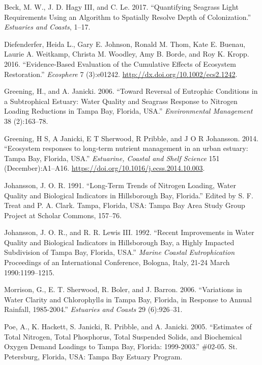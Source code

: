 \documentclass[]{article}
\begin{document}
\leavevmode\hypertarget{ref-Beck17c}{}%
Beck, M. W., J. D. Hagy III, and C. Le. 2017. ``Quantifying Seagrass
Light Requirements Using an Algorithm to Spatially Resolve Depth of
Colonization.'' \emph{Estuaries and Coasts}, 1--17.

\leavevmode\hypertarget{ref-Diefenderfer16}{}%
Diefenderfer, Heida L., Gary E. Johnson, Ronald M. Thom, Kate E. Buenau,
Laurie A. Weitkamp, Christa M. Woodley, Amy B. Borde, and Roy K. Kropp.
2016. ``Evidence-Based Evaluation of the Cumulative Effects of Ecosystem
Restoration.'' \emph{Ecosphere} 7 (3):e01242.
\url{http://dx.doi.org/10.1002/ecs2.1242}.

\leavevmode\hypertarget{ref-Greening06}{}%
Greening, H., and A. Janicki. 2006. ``Toward Reversal of Eutrophic
Conditions in a Subtrophical Estuary: Water Quality and Seagrass
Response to Nitrogen Loading Reductions in Tampa Bay, Florida, USA.''
\emph{Environmental Management} 38 (2):163--78.

\leavevmode\hypertarget{ref-Greening2014}{}%
Greening, H S, A Janicki, E T Sherwood, R Pribble, and J O R Johansson.
2014. ``Ecosystem responses to long-term nutrient management in an urban
estuary: Tampa Bay, Florida, USA.'' \emph{Estuarine, Coastal and Shelf
Science} 151 (December):A1--A16.
\url{https://doi.org/10.1016/j.ecss.2014.10.003}.

\leavevmode\hypertarget{ref-Johansson91}{}%
Johansson, J. O. R. 1991. ``Long-Term Trends of Nitrogen Loading, Water
Quality and Biological Indicators in Hillsborough Bay, Florida.'' Edited
by S. F. Treat and P. A. Clark. Tampa, Florida, USA: Tampa Bay Area
Study Group Project at Scholar Commons, 157--76.

\leavevmode\hypertarget{ref-Johansson92}{}%
Johansson, J. O. R., and R. R. Lewis III. 1992. ``Recent Improvements in
Water Quality and Biological Indicators in Hillsborough Bay, a Highly
Impacted Subdivision of Tampa Bay, Florida, USA.'' \emph{Marine Coastal
Eutrophication} Proceedings of an International Conference, Bologna,
Italy, 21-24 March 1990:1199--1215.

\leavevmode\hypertarget{ref-Morrison06}{}%
Morrison, G., E. T. Sherwood, R. Boler, and J. Barron. 2006.
``Variations in Water Clarity and Chlorophyll\emph{a} in Tampa Bay,
Florida, in Response to Annual Rainfall, 1985-2004.'' \emph{Estuaries
and Coasts} 29 (6):926--31.

\leavevmode\hypertarget{ref-Poe05}{}%
Poe, A., K. Hackett, S. Janicki, R. Pribble, and A. Janicki. 2005.
``Estimates of Total Nitrogen, Total Phosphorus, Total Suspended Solids,
and Biochemical Oxygen Demand Loadings to Tampa Bay, Florida:
1999-2003.'' \#02-05. St. Petersburg, Florida, USA: Tampa Bay Estuary
Program.
\end{document}

